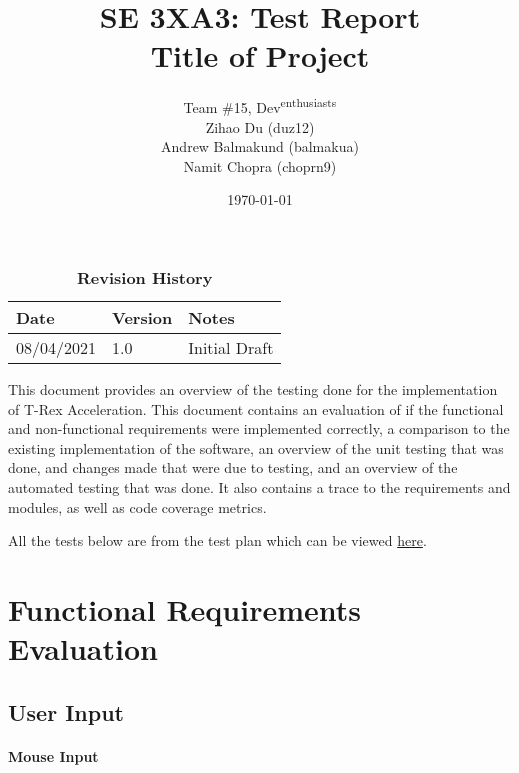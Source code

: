 \documentclass[12pt, titlepage]{article}
\title{SE 3XA3: Test Report\\Title of Project}
\author{Team \#15, Dev\textsuperscript{enthusiasts}
		\\ Zihao Du (duz12)
		\\  Andrew Balmakund (balmakua) 
		\\ Namit Chopra (choprn9)
}
\date{\today}
\begin{document}
\maketitle

\tableofcontents
\listoftables
\listoffigures

\begin{table}[bp]
\caption{\bf Revision History}
\begin{tabularx}{\textwidth}{p{3cm}p{2cm}X}
\toprule {\bf Date} & {\bf Version} & {\bf Notes}\\
\midrule
08/04/2021 & 1.0 & Initial Draft\\
\bottomrule
\end{tabularx}
\end{table}

\newpage


This document provides an overview of the testing done for the implementation of T-Rex Acceleration. This document contains an evaluation of if the functional and non-functional requirements were implemented correctly, a comparison to the existing implementation of the software, an overview of the unit testing that was done, and changes made that were due to testing, and an overview of the automated testing that was done. It also contains a trace to the requirements and modules, as well as code coverage metrics.

All the tests below are from the test plan which can be viewed  \href{https://gitlab.cas.mcmaster.ca/se_3xa3_l3g15/se_3xa3_project/-/blob/master/Doc/TestPlan/TestPlan.pdf}{here}.

\section{Functional Requirements Evaluation}
\subsection{User Input}

\paragraph{Mouse Input}
\end{document}
